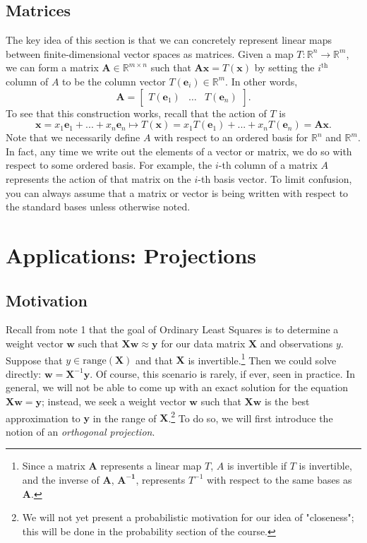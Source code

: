 \documentclass{article}
\newcommand{\R}{\mathbb{R}}
\newcommand{\tit}{\textit}
\newcommand{\tbf}{\textbf}
\begin{document}
\subsection{Matrices}
The key idea of this section is that we can concretely represent linear maps between finite-dimensional vector spaces as matrices. Given a map $T: \R^n \to \R^m$, we can form a matrix $\tbf{A} \in \R^{m\times n}$ such that $\tbf{A}\tbf{x} = T(\tbf{x})$ by setting the $i^{\text{th}}$ column of $A$ to be the column vector $T(\tbf{e}_i) \in \R^m$. In other words, 
$$
\tbf{A} = 
\begin{bmatrix}
T(\tbf{e}_1) & \dots & T(\tbf{e}_n) 
\end{bmatrix}.
$$
To see that this construction works, recall that the action of $T$ is
 $$
 \tbf{x} = x_1\tbf{e}_1 + ... + x_n \tbf{e}_n \mapsto T(\tbf{x}) = x_1T(\tbf{e}_1) + ... + x_n T(\tbf{e}_n) = \tbf{A}\tbf{x}.
 $$
Note that we necessarily define $A$ with respect to an ordered basis for $\R^n$ and $\R^m$. In fact, any time we write out the elements of a vector or matrix, we do so with respect to some ordered basis. For example, the $i$-th column of a matrix $A$ represents the action of that matrix on the $i$-th basis vector. To limit confusion, you can always assume that a matrix or vector is being written with respect to the standard bases unless otherwise noted.

\clearpage
\section{Applications: Projections}
\subsection{Motivation}
Recall from note 1 that the goal of Ordinary Least Squares is to determine a weight vector $\mathbf{w}$ such that $\mathbf{Xw} \approx \mathbf{y}$ for our data matrix $\mathbf{X}$ and observations $y$. Suppose that $y \in \text{range}(\mathbf{X})$ and that $\mathbf{X}$ is invertible.\footnote{Since a matrix $\mathbf{A}$ represents a linear map $T$, $A$ is invertible if $T$ is invertible, and the inverse of $\mathbf{A}$, $\mathbf{A^{-1}}$, represents $T^{-1}$ with respect to the same bases as $\mathbf{A}$.} Then we could solve directly: $\mathbf{w} = \mathbf{X}^{-1}\mathbf{y}$. Of course, this scenario is rarely, if ever, seen in practice. In general, we will not be able to come up with an exact solution for the equation $\mathbf{Xw} = \mathbf{y}$; instead, we seek a weight vector $\mathbf{w}$ such that $\mathbf{Xw}$ is the best approximation to $\mathbf{y}$ in the range of $\mathbf{X}$.\footnote{We will not yet present a probabilistic motivation for our idea of "closeness"; this will be done in the probability section of the course.} To do so, we will first introduce the notion of an \tit{orthogonal projection}.
\end{document}
